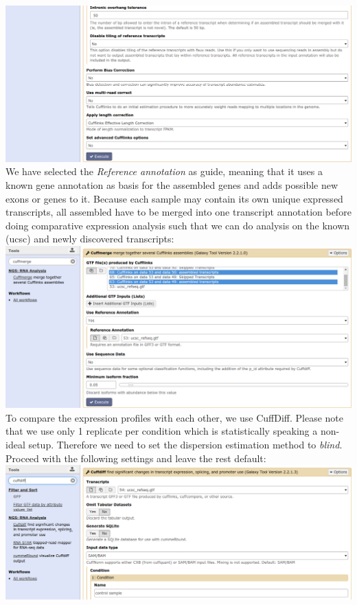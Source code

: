 \includegraphics[width=\textwidth]{figures/basic_02b.png}\\
We have selected the \textit{Reference annotation} as guide, meaning that it uses a known gene annotation as basis for the assembled genes and adds possible new exons or genes to it. Because each sample may contain its own unique expressed transcripts, all assembled have to be merged into one transcript annotation before doing comparative expression analysis such that we can do analysis on the known (ucsc) and newly discovered transcripts:\\
\includegraphics[width=\textwidth]{figures/basic_03.png}\\
To compare the expression profiles with each other, we use CuffDiff. Please note that we use only 1 replicate per condition which is statistically speaking a non-ideal setup. Therefore we need to set the dispersion estimation method to \textit{blind}. Proceed with the following settings and leave the rest default:\\
\includegraphics[width=\textwidth]{figures/basic_04a.png}\\
